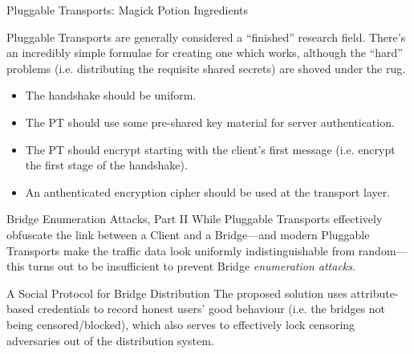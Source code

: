 \documentclass[9pt,a4paper,handout]{beamer}
\begin{document}
\begin{frame}{Pluggable Transports: Magick Potion Ingredients}

  Pluggable Transports are generally considered a ``finished'' research field.  There's an
  incredibly simple formulae for creating one which works, although the ``hard'' problems
  (i.e. distributing the requisite shared secrets) are shoved under the rug.

  \begin{itemize}
    \item<2-> The handshake should be uniform.

    \item<3-> The PT should use some pre-shared key material for server authentication.
    \item<4-> The PT should encrypt starting with the client's first message (i.e. encrypt the first
      stage of the handshake).
    \item<5-> An anthenticated encryption cipher should be used at the transport layer.
  \end{itemize}


\end{frame}


\begin{frame}{Bridge Enumeration Attacks, Part II}
  While Pluggable Transports effectively obfuscate the link between a Client and a Bridge—and modern
  Pluggable Transports make the traffic data look uniformly indistinguishable from random—this turns
  out to be insufficient to prevent Bridge \emph{enumeration attacks}.

\end{frame}


\begin{frame}{A Social Protocol for Bridge Distribution}
  The proposed solution uses attribute-based credentials to record honest users' good behaviour
  (i.e. the bridges not being censored/blocked), which also serves to effectively lock censoring
  adversaries out of the distribution system.

\end{frame}
  
\end{document}
